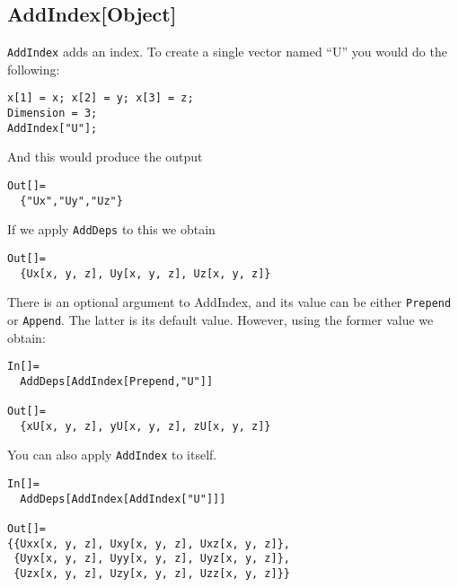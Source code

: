 \subsection{AddIndex[Object]}
{\tt AddIndex} adds an index.  To create a single vector named ``U'' you
would do the following:
\begin{verbatim}
x[1] = x; x[2] = y; x[3] = z;
Dimension = 3;
AddIndex["U"];
\end{verbatim}
And this would produce the output
\begin{verbatim}
Out[]=
  {"Ux","Uy","Uz"}
\end{verbatim}
If we apply {\tt AddDeps} to this we obtain
\begin{verbatim}
Out[]=
  {Ux[x, y, z], Uy[x, y, z], Uz[x, y, z]}
\end{verbatim}
There is an optional argument to AddIndex, and its value can be
either {\tt Prepend} or {\tt Append}.  The latter is its default
value.  However, using the former value we obtain:
\begin{verbatim}
In[]=
  AddDeps[AddIndex[Prepend,"U"]]

Out[]=
  {xU[x, y, z], yU[x, y, z], zU[x, y, z]}
\end{verbatim}

You can also apply {\tt AddIndex} to itself.
\begin{verbatim}
In[]=
  AddDeps[AddIndex[AddIndex["U"]]]

Out[]=
{{Uxx[x, y, z], Uxy[x, y, z], Uxz[x, y, z]}, 
 {Uyx[x, y, z], Uyy[x, y, z], Uyz[x, y, z]}, 
 {Uzx[x, y, z], Uzy[x, y, z], Uzz[x, y, z]}}
\end{verbatim}

